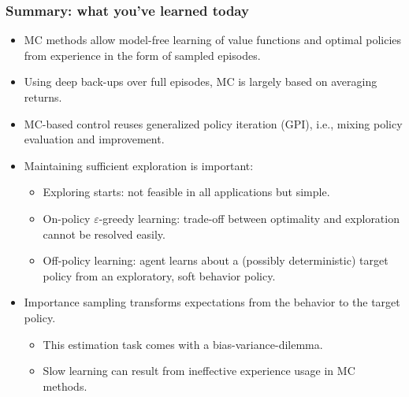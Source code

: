 \begin{frame}
  \frametitle{Summary: what you've learned today}
  \begin{itemize}
  \item MC methods allow model-free learning of value functions and optimal policies from experience in the form of sampled episodes.
  \item Using deep back-ups over full episodes, MC is largely based on averaging returns. \pause
  \item MC-based control reuses generalized policy iteration (GPI), i.e., mixing policy evaluation and improvement. \pause
  \item Maintaining sufficient exploration is important:
    \begin{itemize}
    \item Exploring starts: not feasible in all applications but simple.
    \item On-policy $\varepsilon$-greedy learning: trade-off between optimality and exploration cannot be resolved easily.
    \item Off-policy learning: agent learns about a (possibly deterministic) target policy from an exploratory, soft behavior policy.
    \end{itemize}\pause
  \item Importance sampling transforms expectations from the behavior to the target policy.
    \begin{itemize}
    \item This estimation task comes with a bias-variance-dilemma.
    \item Slow learning can result from ineffective experience usage in MC methods.
    \end{itemize}
  \end{itemize}
\end{frame}
